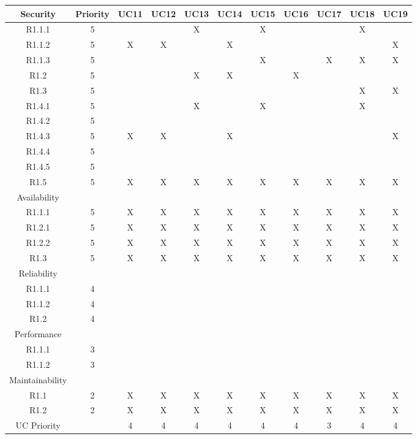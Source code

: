 \documentclass[11pt]{article}
\begin{document}
\begin{center}
	\hspace*{-1.1cm}\begin{tabular}{|c|c|c|c|c|c|c|c|c|c|c|}
	\hline
	Security & Priority & UC11 & UC12 & UC13 & UC14 & UC15 & UC16 & UC17 & UC18 & UC19 \\
	\hline
	R1.1.1 & 5 & & & X & & X & & & X & \\
	\hline
	R1.1.2 & 5 & X & X & & X & & & & & X \\
	\hline
	R1.1.3 & 5 & & & & & X & & X & X & X \\
	\hline
	R1.2 & 5 & & & X & X & & X & & & \\
	\hline
	R1.3 & 5 & & & & & & & & X & X \\
	\hline 
	R1.4.1 & 5 & & & X & & X & & & X & \\
	\hline
	R1.4.2 & 5 & & & & & & & & & \\
	\hline
	R1.4.3 & 5 & X & X & & X & & & & & X \\
	\hline
	R1.4.4 & 5 & & & & & & & & & \\
	\hline
	R1.4.5 & 5 & & & & & & & & & \\
	\hline
	R1.5 & 5 & X & X & X & X & X & X & X & X & X \\
	\hline
	Availability & & & & & & & & & & \\
	\hline
	R1.1.1 & 5 & X & X & X & X & X & X & X & X & X \\
	\hline
	R1.2.1 & 5 & X & X & X & X & X & X & X & X & X \\
	\hline
	R1.2.2 & 5 & X & X & X & X & X & X & X & X & X \\
	\hline 
	R1.3 & 5 & X & X & X & X & X & X & X & X & X \\
	\hline
	Reliability & & & & & & & & & & \\
	\hline
	R1.1.1 & 4 & & & & & & & & & \\
	\hline
	R1.1.2 & 4 & & & & & & & & & \\
	\hline
	R1.2 & 4 & & & & & & & & & \\
	\hline
	Performance & & & & & & & & & & \\
	\hline
	R1.1.1 & 3 & & & & & & & & & \\
	\hline
	R1.1.2 & 3 & & & & & & & & & \\
	\hline
	Maintainability & & & & & & & & & & \\
	\hline
	R1.1 & 2 & X & X & X & X & X & X & X & X & X \\
	\hline
	R1.2 & 2 & X & X & X & X & X & X & X & X & X \\
	\hline
	UC Priority & & 4 & 4 & 4 & 4 & 4 & 4 & 3 & 4 & 4\\
	\hline
	\end{tabular}
\end{center}
\end{document}
